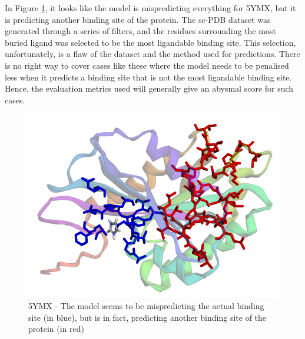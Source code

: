 \documentclass[journal=jacsat,manuscript=article]{achemso}
\begin{document}
In Figure \ref{fig:5ymx}, it looks like the model is mispredicting everything for 5YMX\cite{galicia2019mgla}, but it is predicting another binding site of the protein. The sc-PDB\cite{desaphy2015sc} dataset was generated through a series of filters, and the residues surrounding the most buried ligand was selected to be the most ligandable binding site. This selection, unfortunately, is a flaw of the dataset and the method used for predictions. There is no right way to cover cases like these where the model needs to be penalised less when it predicts a binding site that is not the most ligandable binding site. Hence, the evaluation metrics used will generally give an abysmal score for such cases.
\begin{figure}
    \centering
    \noindent\includegraphics[scale=0.4]{5ymx.png}
    \caption{\centering 5YMX - The model seems to be mispredicting the actual binding site (in blue), but is in fact, predicting another binding site of the protein (in red)}
    \label{fig:5ymx}
\end{figure}
\end{document}
